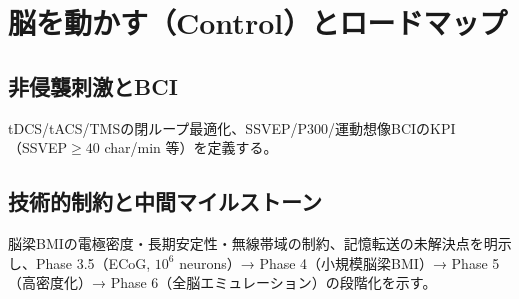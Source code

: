 \chapter{脳を動かす（Control）とロードマップ}
\section{非侵襲刺激とBCI}
tDCS/tACS/TMSの閉ループ最適化、SSVEP/P300/運動想像BCIのKPI（SSVEP\(\geq 40\) char/min 等）を定義する。

\section{技術的制約と中間マイルストーン}
脳梁BMIの電極密度・長期安定性・無線帯域の制約、記憶転送の未解決点を明示し、Phase 3.5（ECoG, \(10^6\) neurons）→ Phase 4（小規模脳梁BMI）→ Phase 5（高密度化）→ Phase 6（全脳エミュレーション）の段階化を示す。


